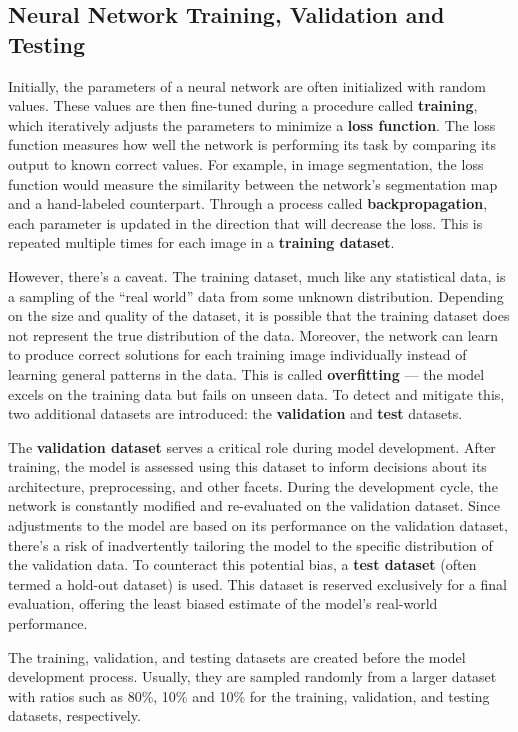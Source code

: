 \subsection{Neural Network Training, Validation and Testing}

Initially, the parameters of a neural network are often initialized with random values. These values are then fine-tuned during a procedure called \textbf{training}, which iteratively adjusts the parameters to minimize a \textbf{loss function}. The loss function measures how well the network is performing its task by comparing its output to known correct values. For example, in image segmentation, the loss function would measure the similarity between the network's segmentation map and a hand-labeled counterpart. Through a process called \textbf{backpropagation}, each parameter is updated in the direction that will decrease the loss. This is repeated multiple times for each image in a \textbf{training dataset}.

However, there's a caveat. The training dataset, much like any statistical data, is a sampling of the ``real world'' data from some unknown distribution. Depending on the size and quality of the dataset, it is possible that the training dataset does not represent the true distribution of the data. Moreover, the network can learn to produce correct solutions for each training image individually instead of learning general patterns in the data. This is called \textbf{overfitting} --- the model excels on the training data but fails on unseen data. To detect and mitigate this, two additional datasets are introduced: the \textbf{validation} and \textbf{test} datasets.

The \textbf{validation dataset} serves a critical role during model development. After training, the model is assessed using this dataset to inform decisions about its architecture, preprocessing, and other facets. During the development cycle, the network is constantly modified and re-evaluated on the validation dataset. Since adjustments to the model are based on its performance on the validation dataset, there's a risk of inadvertently tailoring the model to the specific distribution of the validation data. To counteract this potential bias, a \textbf{test dataset} (often termed a hold-out dataset) is used. This dataset is reserved exclusively for a final evaluation, offering the least biased estimate of the model's real-world performance.

The training, validation, and testing datasets are created before the model development process. Usually, they are sampled randomly from a larger dataset with ratios such as 80\%, 10\% and 10\% for the training, validation, and testing datasets, respectively. 

